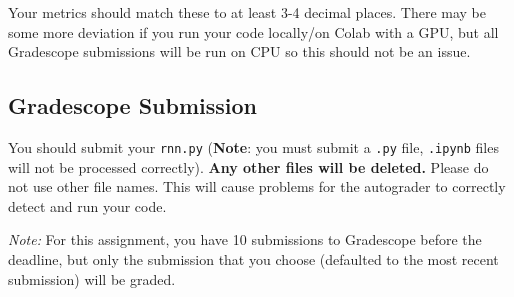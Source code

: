 \documentclass[11pt,addpoints,answers]{exam}
\begin{document}
Your metrics should match these to at least 3-4 decimal places. There may be some more deviation if you run your code locally/on Colab with a GPU, but all Gradescope submissions will be run on CPU so this should not be an issue.

\subsection{Gradescope Submission}

You should submit your \texttt{rnn.py} (\textbf{Note}: you must submit a \texttt{.py} file, \texttt{.ipynb} files will not be processed correctly). \textbf{Any other files will be deleted.} Please do not use other file names. This will cause problems for the autograder to correctly detect and run your code.


\textit{Note:} For this assignment, you have 10 submissions to Gradescope before the deadline, but only the submission that you choose (defaulted to the most recent submission) will be graded.
\end{document}
